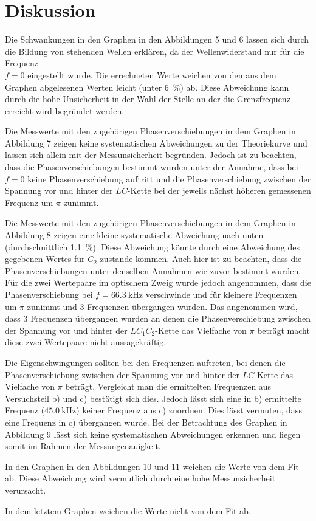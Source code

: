 
\section{Diskussion}
\label{sec:Diskussion}

Die Schwankungen in den Graphen in den Abbildungen 5 und 6 lassen sich durch die Bildung von stehenden Wellen erklären, da der Wellenwiderstand nur für die Frequenz \\$f=0$ eingestellt wurde. Die errechneten Werte weichen von den aus dem Graphen abgelesenen Werten leicht (unter \SI{6}{\percent}) ab. Diese Abweichung kann durch die hohe Unsicherheit in der Wahl der Stelle an der die Grenzfrequenz erreicht wird begründet werden. 

Die Messwerte mit den zugehörigen Phasenverschiebungen in dem Graphen in Abbildung 7 zeigen keine systematischen Abweichungen zu der Theoriekurve und lassen sich allein mit der Messunsicherheit begründen. Jedoch ist zu beachten, dass die Phasenverschiebungen bestimmt wurden unter der Annahme, dass bei $f=0$ keine Phasenverschiebung auftritt und die Phasenverschiebung zwischen der Spannung vor und hinter der $LC$-Kette bei der jeweils nächst höheren gemessenen Frequenz um $\pi$ zunimmt.

Die Messwerte mit den zugehörigen Phasenverschiebungen in dem Graphen in Abbildung 8 zeigen eine kleine systematische Abweichung nach unten (durchschnittlich \SI{1.1}{\percent}). Diese Abweichung könnte durch eine Abweichung des gegebenen Wertes für $C_2$ zustande kommen. Auch hier ist zu beachten, dass die Phasenverschiebungen unter denselben Annahmen wie zuvor bestimmt wurden. Für die zwei Wertepaare im optischem Zweig wurde jedoch angenommen, dass die Phasenverschiebung bei $f=\SI{66.3}{\kilo\hertz}$ verschwinde und für kleinere Frequenzen um $\pi$ zunimmt und 3 Frequenzen übergangen wurden. Das angenommen wird, dass 3 Frequenzen übergangen wurden an denen die Phasenverschiebung zwischen der Spannung vor und hinter der $LC_1C_2$-Kette das Vielfache von $\pi$ beträgt macht diese zwei Wertepaare nicht aussagekräftig.

Die Eigenschwingungen sollten bei den Frequenzen auftreten, bei denen die Phasenverschiebung zwischen der Spannung vor und hinter der $LC$-Kette das Vielfache von $\pi$ beträgt. Vergleicht man die ermittelten Frequenzen aus Versuchsteil b) und c) bestätigt sich dies. Jedoch lässt sich eine in b) ermittelte Frequenz ($\SI{45.0}{\kilo\hertz}$) keiner Frequenz aus c) zuordnen. Dies lässt vermuten, dass eine Frequenz in c) übergangen wurde.
Bei der Betrachtung des Graphen in Abbildung 9 lässt sich keine systematischen Abweichungen erkennen und liegen somit im Rahmen der Messungenauigkeit.

In den Graphen in den Abbildungen 10 und 11 weichen die Werte von dem Fit ab. Diese Abweichung wird vermutlich durch eine hohe Messunsicherheit verursacht.

In dem letztem Graphen weichen die Werte nicht von dem Fit ab.







	

